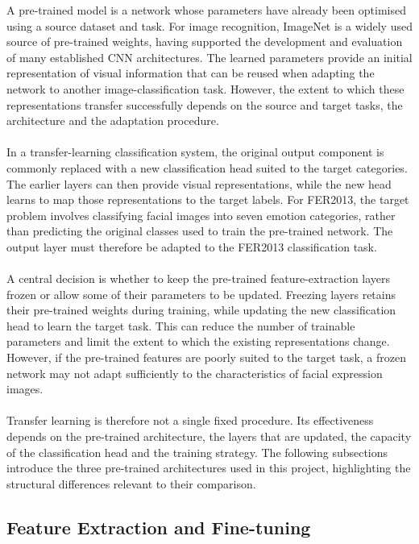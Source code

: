 \documentclass[12pt, a4paper]{report}
\let\oldsubsection\subsection
\renewcommand{\subsection}{%
    \Needspace{6\baselineskip}%
    \oldsubsection
}
\begin{document}
				A pre-trained model is a network whose parameters have already been optimised using a source dataset and task. For image recognition, ImageNet is a widely used source of pre-trained weights, having supported the development and evaluation of many established CNN architectures. The learned parameters provide an initial representation of visual information that can be reused when adapting the network to another image-classification task. However, the extent to which these representations transfer successfully depends on the source and target tasks, the architecture and the adaptation procedure.\\\\
				In a transfer-learning classification system, the original output component is commonly replaced with a new classification head suited to the target categories. The earlier layers can then provide visual representations, while the new head learns to map those representations to the target labels. For FER2013, the target problem involves classifying facial images into seven emotion categories, rather than predicting the original classes used to train the pre-trained network. The output layer must therefore be adapted to the FER2013 classification task.\\\\
				A central decision is whether to keep the pre-trained feature-extraction layers frozen or allow some of their parameters to be updated. Freezing layers retains their pre-trained weights during training, while updating the new classification head to learn the target task. This can reduce the number of trainable parameters and limit the extent to which the existing representations change. However, if the pre-trained features are poorly suited to the target task, a frozen network may not adapt sufficiently to the characteristics of facial expression images.\\\\
				Transfer learning is therefore not a single fixed procedure. Its effectiveness depends on the pre-trained architecture, the layers that are updated, the capacity of the classification head and the training strategy. The following subsections introduce the three pre-trained architectures used in this project, highlighting the structural differences relevant to their comparison.
				
			\subsection{Feature Extraction and Fine-tuning}
				
\end{document}
